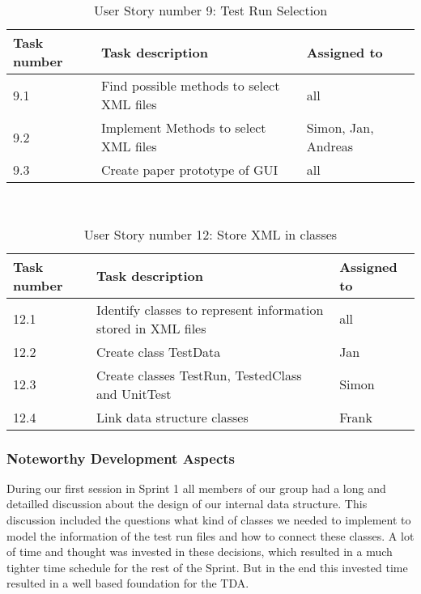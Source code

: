 \begin{table}[h]
  \caption{User Story number 9: Test Run Selection}
  \label{US_Selection}
  \centering
  \begin{tabular}{p{1.5cm}|p{9cm}|p{3cm}|}
  	Task number & Task description & Assigned to \\ 
  	\hline
  	\hline
  	9.1 & Find possible methods to select XML files & all \\ 
  	\hline
  	9.2 & Implement Methods to select XML files & Simon, Jan, Andreas \\ 
  	\hline
  	9.3 & Create paper prototype of GUI & all \\
  	\hline
  \end{tabular}
\end{table} 

\ \\ 

\begin{table}[h]
  \caption{User Story number 12: Store XML in classes}
  \label{US_Storage}
  \centering
  \begin{tabular}{p{1.5cm}|p{9cm}|p{3cm}|}
  	Task number & Task description & Assigned to \\ 
  	\hline
  	\hline
  	12.1 & Identify classes to represent information stored in XML files & all \\ 
  	\hline
  	12.2 & Create class TestData & Jan \\ 
  	\hline
  	12.3 & Create classes TestRun, TestedClass and UnitTest & Simon \\ 
  	\hline
  	12.4 & Link data structure classes & Frank \\ 
  	\hline
  \end{tabular}
\end{table} 

\subsubsection*{Noteworthy Development Aspects}

During our first session in Sprint 1 all members of our group had a long and detailled discussion about the design of our internal data structure. This discussion included the questions what kind of classes we needed to implement to model the information of the test run files and how to connect these classes. A lot of time and thought was invested in these decisions, which resulted in a much tighter time schedule for the rest of the Sprint. But in the end this invested time resulted in a well based foundation for the TDA. \\ 

